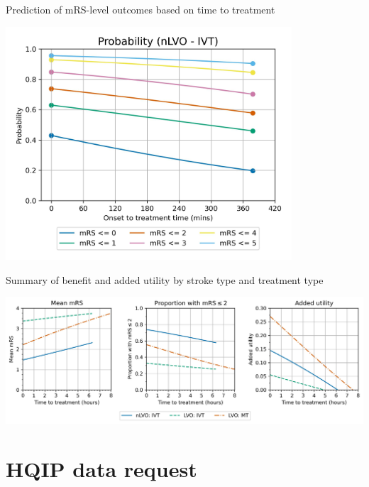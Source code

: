 \documentclass[xcolor={usenames,dvipsnames}]{beamer}
\begin{document}
\begin{frame}{Prediction of mRS-level outcomes based on time to treatment}

\begin{center}
\includegraphics[width=0.80\textwidth]{./images/prob_with_time_nlvo_ivt}
\end{center}
    
\end{frame}


\begin{frame}{Summary of benefit and added utility by stroke type and treatment type}

\begin{center}
\includegraphics[width=1.0\textwidth]{./images/time_to_treatment}
\end{center}
    
\end{frame}

\section{HQIP data request}
\end{document}
